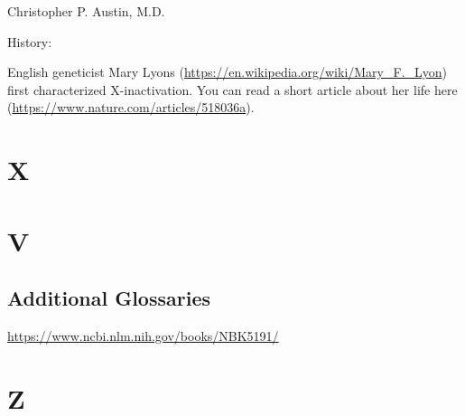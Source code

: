 \documentclass[
]{book}
\begin{document}
Christopher P. Austin, M.D.

History:

English geneticist Mary Lyons (\url{https://en.wikipedia.org/wiki/Mary_F._Lyon}) first characterized X-inactivation. You can read a short article about her life here (\url{https://www.nature.com/articles/518036a}).

\hypertarget{x}{%
\chapter{X}\label{x}}

\hypertarget{v-1}{%
\chapter{V}\label{v-1}}

\hypertarget{additional-glossaries}{%
\section{Additional Glossaries}\label{additional-glossaries}}

\url{https://www.ncbi.nlm.nih.gov/books/NBK5191/}

\hypertarget{z}{%
\chapter{Z}\label{z}}
\end{document}
